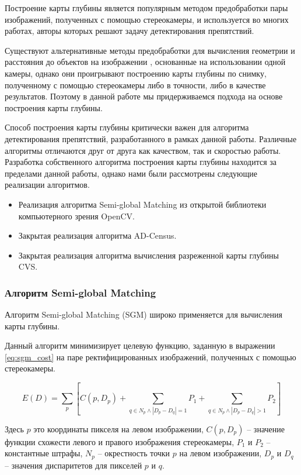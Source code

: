 \documentclass[aps,%
14pt,%
final,%
oneside,
onecolumn,%
musixtex, %
superscriptaddress,%
centertags]{extarticle} %
\begin{document}
Построение карты глубины является популярным методом предобработки пары изображений, полученных с помощью стереокамеры, и используется во многих работах, авторы которых решают задачу детектирования препятствий.

Существуют альтернативные методы предобработки для вычисления геометрии и расстояния до объектов на изображении \cite{monodepth17}\cite{koenderink1991affine}, основанные на использовании одной камеры, однако они проигрывают построению карты глубины по снимку, полученному с помощью стереокамеры либо в точности, либо в качестве результатов. Поэтому в данной работе мы придерживаемся подхода на основе построения карты глубины.

Способ построения карты глубины критически важен для алгоритма детектирования препятствий, разработанного в рамках данной работы. Различные алгоритмы отличаются друг от друга как качеством, так и скоростью работы. Разработка собственного алгоритма построения карты глубины находится за пределами данной работы, однако нами были рассмотрены следующие реализации алгоритмов.
\begin{itemize}
\item Реализация алгоритма Semi-global Matching из открытой библиотеки компьютерного зрения OpenCV\cite{itseez2015opencv}.
\item Закрытая реализация алгоритма AD-Census.
\item Закрытая реализация алгоритма вычисления разреженной карты глубины CVS.
\end{itemize}

\subsubsection{Алгоритм Semi-global Matching}
Алгоритм Semi-global Matching \cite{hirschmuller2005accurate} (SGM) широко применяется для вычисления карты глубины.

Данный алгоритм минимизирует целевую функцию, заданную в выражении \ref{eq:sgm_cost} на паре ректифицированных изображений, полученных с помощью стереокамеры.

\begin{equation} \label{eq:sgm_cost}
E(D)=\sum_p [C(p, D_p) + \sum_{q \in N_p \land |D_p - D_q| = 1} P_1 + \sum_{q \in N_p \land |D_p - D_q| > 1} P_2]
\end{equation}

Здесь $p$ это координаты пикселя на левом изображении, $C(p, D_p)$ -- значение функции схожести левого и правого изображения стереокамеры, $P_1$ и $P_2$ -- константные штрафы, $N_p$ -- окрестность точки $p$ на левом изображении, $D_p$ и $D_q$ -- значения диспаритетов для пикселей $p$ и $q$.
\end{document}
